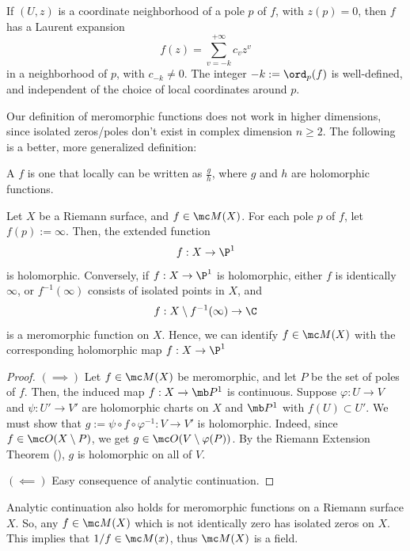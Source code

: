 \documentclass[11pt]{report}
\begin{document}
\begin{rmk}
    If $(U,z)$ is a coordinate neighborhood of a pole $p$ of $f$, with $z(p)=0$, then $f$ has a Laurent expansion 
    $$f(z) = \sum_{v=-k}^{+\infty} c_vz^v$$
    in a neighborhood of $p$, with $c_{-k} \neq 0$. The integer $-k:=\ord_p(f)$ is well-defined, and independent of the choice of local coordinates around $p$.
\end{rmk}

Our definition of meromorphic functions does not work in higher dimensions, since isolated zeros/poles don't exist in complex dimension $n\geq 2$. The following is a better, more generalized definition:
\begin{defn}
    A  $f$ is one that locally can be written as $\frac{g}{h}$, where $g$ and $h$ are holomorphic functions.
\end{defn}

\begin{thm}[][label=thm:mer_is_hol]
    Let $X$ be a Riemann surface, and $f \in \mc M(X)$. For each pole $p$ of $f$, let $f(p):= \infty$. Then, the extended function
    $$f:X \to \P^1$$
    is holomorphic. Conversely, if $f:X \to \P^1$ is holomorphic, either $f$ is identically $\infty$, or $f^{-1}(\infty)$ consists of isolated points in $X$, and
    $$f:X\setminus f^{-1}(\infty) \to \C$$
    is a meromorphic function on $X$. Hence, we can identify $f \in \mc M(X)$ with the corresponding holomorphic map $f:X \to \P^1$
\end{thm}

\begin{proof}
\hfill \break
    $(\implies)$ Let $f \in \mc M(X)$ be meromorphic, and let $P$ be the set of poles of $f$. Then, the induced map $f:X \to \mb P^1$ is continuous. Suppose $\varphi:U \to V$ and $\psi:U'\to V'$ are holomorphic charts on $X$ and $\mb P^1$ with $f(U) \subset U'$. We must show that $g:= \psi \circ f \circ \varphi^{-1}:V \to V'$ is holomorphic. Indeed, since $f \in \mc O(X \setminus P)$, we get $g \in \mc O(V\setminus \varphi(P))$. By the Riemann Extension Theorem (), $g$ is holomorphic on all of $V$.

    $(\impliedby)$ Easy consequence of analytic continuation.
\end{proof}

\begin{cor}
    Analytic continuation also holds for meromorphic functions on a Riemann surface $X$. So, any $f \in \mc M(X)$ which is not identically zero has isolated zeros on $X$. This implies that $1/f\in \mc M(x)$, thus $\mc M(X)$ is a field.
\end{cor}
\end{document}
